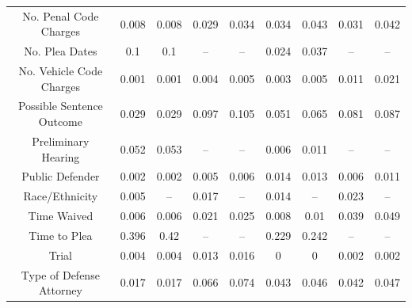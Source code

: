\documentclass{AISB2008}
\begin{document}
\begin{table}[]
\begin{tabular}{@{}ccccc@{\qquad}cccc@{}}
No. Penal Code Charges    & 0.008                 & 0.008                & 0.029                & 0.034                  & 0.034                 & 0.043                & 0.031                & 0.042                \\
No. Plea Dates            & 0.1                   & 0.1                  & --                   & --                     & 0.024                 & 0.037                & --                   & --                   \\
No. Vehicle Code Charges  & 0.001                 & 0.001                & 0.004                & 0.005                  & 0.003                 & 0.005                & 0.011                & 0.021                \\
Possible Sentence Outcome & 0.029                 & 0.029                & 0.097                & 0.105                  & 0.051                 & 0.065                & 0.081                & 0.087                \\
Preliminary Hearing       & 0.052                 & 0.053                & --                   & --                     & 0.006                 & 0.011                & --                   & --                   \\
Public Defender           & 0.002                 & 0.002                & 0.005                & 0.006                  & 0.014                 & 0.013                & 0.006                & 0.011                \\
Race/Ethnicity            & 0.005                 & --                   & 0.017                & --                     & 0.014                 & --                   & 0.023                & --                   \\
Time Waived               & 0.006                 & 0.006                & 0.021                & 0.025                  & 0.008                 & 0.01                 & 0.039                & 0.049                \\
Time to Plea              & 0.396                 & 0.42                 & --                   & --                     & 0.229                 & 0.242                & --                   & --                   \\
Trial                     & 0.004                 & 0.004                & 0.013                & 0.016                  & 0                     & 0                    & 0.002                & 0.002                \\
Type of Defense Attorney  & 0.017                 & 0.017                & 0.066                & 0.074                  & 0.043                 & 0.046                & 0.042                & 0.047                \\

\end{tabular}
\end{table}
\end{document}
